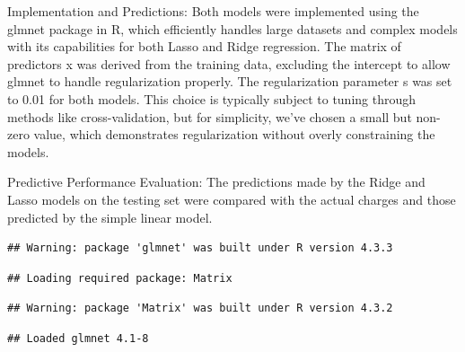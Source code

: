\documentclass[
  12pt,
]{article}
\begin{document}
Implementation and Predictions: Both models were implemented using the
glmnet package in R, which efficiently handles large datasets and
complex models with its capabilities for both Lasso and Ridge
regression. The matrix of predictors x was derived from the training
data, excluding the intercept to allow glmnet to handle regularization
properly. The regularization parameter s was set to 0.01 for both
models. This choice is typically subject to tuning through methods like
cross-validation, but for simplicity, we've chosen a small but non-zero
value, which demonstrates regularization without overly constraining the
models.

Predictive Performance Evaluation: The predictions made by the Ridge and
Lasso models on the testing set were compared with the actual charges
and those predicted by the simple linear model.

\begin{verbatim}
## Warning: package 'glmnet' was built under R version 4.3.3
\end{verbatim}

\begin{verbatim}
## Loading required package: Matrix
\end{verbatim}

\begin{verbatim}
## Warning: package 'Matrix' was built under R version 4.3.2
\end{verbatim}

\begin{verbatim}
## Loaded glmnet 4.1-8
\end{verbatim}
\end{document}
